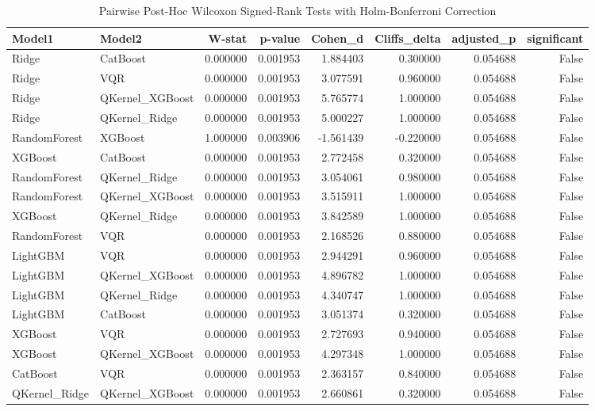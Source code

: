 \begin{table}
\caption{Pairwise Post-Hoc Wilcoxon Signed-Rank Tests with Holm-Bonferroni Correction}
\label{tab:pairwise_wilcoxon}
\begin{tabular}{llrrrrrr}
\toprule
Model1 & Model2 & W-stat & p-value & Cohen_d & Cliffs_delta & adjusted_p & significant \\
\midrule
Ridge & CatBoost & 0.000000 & 0.001953 & 1.884403 & 0.300000 & 0.054688 & False \\
Ridge & VQR & 0.000000 & 0.001953 & 3.077591 & 0.960000 & 0.054688 & False \\
Ridge & QKernel_XGBoost & 0.000000 & 0.001953 & 5.765774 & 1.000000 & 0.054688 & False \\
Ridge & QKernel_Ridge & 0.000000 & 0.001953 & 5.000227 & 1.000000 & 0.054688 & False \\
RandomForest & XGBoost & 1.000000 & 0.003906 & -1.561439 & -0.220000 & 0.054688 & False \\
XGBoost & CatBoost & 0.000000 & 0.001953 & 2.772458 & 0.320000 & 0.054688 & False \\
RandomForest & QKernel_Ridge & 0.000000 & 0.001953 & 3.054061 & 0.980000 & 0.054688 & False \\
RandomForest & QKernel_XGBoost & 0.000000 & 0.001953 & 3.515911 & 1.000000 & 0.054688 & False \\
XGBoost & QKernel_Ridge & 0.000000 & 0.001953 & 3.842589 & 1.000000 & 0.054688 & False \\
RandomForest & VQR & 0.000000 & 0.001953 & 2.168526 & 0.880000 & 0.054688 & False \\
LightGBM & VQR & 0.000000 & 0.001953 & 2.944291 & 0.960000 & 0.054688 & False \\
LightGBM & QKernel_XGBoost & 0.000000 & 0.001953 & 4.896782 & 1.000000 & 0.054688 & False \\
LightGBM & QKernel_Ridge & 0.000000 & 0.001953 & 4.340747 & 1.000000 & 0.054688 & False \\
LightGBM & CatBoost & 0.000000 & 0.001953 & 3.051374 & 0.320000 & 0.054688 & False \\
XGBoost & VQR & 0.000000 & 0.001953 & 2.727693 & 0.940000 & 0.054688 & False \\
XGBoost & QKernel_XGBoost & 0.000000 & 0.001953 & 4.297348 & 1.000000 & 0.054688 & False \\
CatBoost & VQR & 0.000000 & 0.001953 & 2.363157 & 0.840000 & 0.054688 & False \\
QKernel_Ridge & QKernel_XGBoost & 0.000000 & 0.001953 & 2.660861 & 0.320000 & 0.054688 & False \\

\end{tabular}
\end{table}

